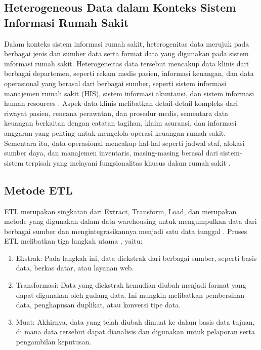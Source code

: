 \subsection{Heterogeneous Data dalam Konteks Sistem Informasi Rumah Sakit}
Dalam konteks sistem informasi rumah sakit, heterogenitas data merujuk pada berbagai jenis dan sumber data serta format data yang digunakan pada sistem informasi rumah sakit. Heterogeneitas data tersebut mencakup data klinis dari berbagai departemen, seperti rekam medis pasien, informasi keuangan, dan data operasional yang berasal dari berbagai sumber, seperti sistem informasi manajemen rumah sakit (HIS), sistem informasi akuntansi, dan sistem informasi human resources \parencite{Amelia2021}. Aspek data klinis melibatkan detail-detail kompleks dari riwayat pasien, rencana perawatan, dan prosedur medis, sementara data keuangan berkaitan dengan catatan tagihan, klaim asuransi, dan informasi anggaran yang penting untuk mengelola operasi keuangan rumah sakit. Sementara itu, data operasional mencakup hal-hal seperti jadwal staf, alokasi sumber daya, dan manajemen inventaris, masing-masing berasal dari sistem-sistem terpisah yang melayani fungsionalitas khusus dalam rumah sakit \parencite{mutawalli2021pengembangan}.

\subsection{Metode ETL}
ETL merupakan singkatan dari Extract, Transform, Load, dan merupakan metode yang digunakan dalam data warehousing untuk mengumpulkan data dari berbagai sumber dan mengintegrasikannya menjadi satu data tunggal \parencite{Fana2021DataWD}. Proses ETL melibatkan tiga langkah utama \parencite{Peng2023}, yaitu:
\begin{enumerate}
  \item Ekstrak: Pada langkah ini, data diekstrak dari berbagai sumber, seperti basis data, berkas datar, atau layanan web.
  \item Transformasi: Data yang diekstrak kemudian diubah menjadi format yang dapat digunakan oleh gudang data. Ini mungkin melibatkan pembersihan data, penghapusan duplikat, atau konversi tipe data.
  \item Muat: Akhirnya, data yang telah diubah dimuat ke dalam basis data tujuan, di mana data tersebut dapat dianalisis dan digunakan untuk pelaporan serta pengambilan keputusan.
\end{enumerate}

